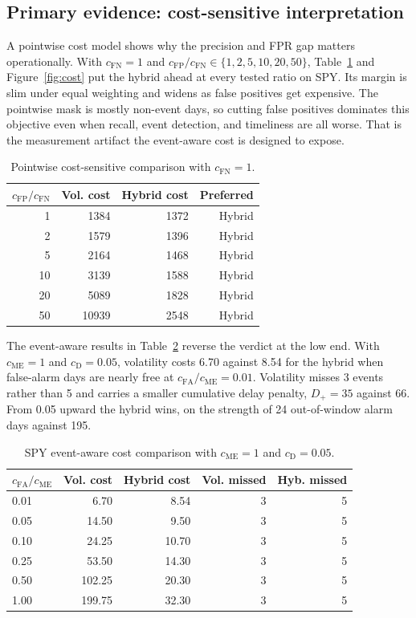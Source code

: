 \documentclass[pdflatex,sn-mathphys-num,iicol]{sn-jnl}
\begin{document}
\subsection{Primary evidence: cost-sensitive interpretation}
\label{sec:cost}
A pointwise cost model shows why the precision and FPR gap matters operationally. With $c_{\mathrm{FN}}=1$ and $c_{\mathrm{FP}}/c_{\mathrm{FN}}\in\{1,2,5,10,20,50\}$, Table~\ref{tab:cost} and Figure~\ref{fig:cost} put the hybrid ahead at every tested ratio on SPY. Its margin is slim under equal weighting and widens as false positives get expensive. The pointwise mask is mostly non-event days, so cutting false positives dominates this objective even when recall, event detection, and timeliness are all worse. That is the measurement artifact the event-aware cost is designed to expose.

\begin{table}[t]
\centering
\caption{Pointwise cost-sensitive comparison with $c_{\mathrm{FN}}=1$.}
\label{tab:cost}
\scriptsize
\begin{tabular}{rrrr}
\toprule
$c_{\mathrm{FP}}/c_{\mathrm{FN}}$ & Vol. cost & Hybrid cost & Preferred\\
\midrule
1 & 1384 & 1372 & Hybrid\\
2 & 1579 & 1396 & Hybrid\\
5 & 2164 & 1468 & Hybrid\\
10 & 3139 & 1588 & Hybrid\\
20 & 5089 & 1828 & Hybrid\\
50 & 10939 & 2548 & Hybrid\\
\bottomrule
\end{tabular}
\end{table}

The event-aware results in Table~\ref{tab:event_cost} reverse the verdict at the low end. With $c_{\mathrm{ME}}=1$ and $c_{\mathrm{D}}=0.05$, volatility costs 6.70 against 8.54 for the hybrid when false-alarm days are nearly free at $c_{\mathrm{FA}}/c_{\mathrm{ME}}=0.01$. Volatility misses 3 events rather than 5 and carries a smaller cumulative delay penalty, $D_+=35$ against 66. From 0.05 upward the hybrid wins, on the strength of 24 out-of-window alarm days against 195.

\begin{table}[t]
\centering
\caption{SPY event-aware cost comparison with $c_{\mathrm{ME}}=1$ and $c_{\mathrm{D}}=0.05$.}
\label{tab:event_cost}
\scriptsize
\begin{tabular}{lrrrr}
\toprule
$c_{\mathrm{FA}}/c_{\mathrm{ME}}$ & Vol. cost & Hybrid cost & Vol. missed & Hyb. missed\\
\midrule
0.01 & 6.70 & 8.54 & 3 & 5\\
0.05 & 14.50 & 9.50 & 3 & 5\\
0.10 & 24.25 & 10.70 & 3 & 5\\
0.25 & 53.50 & 14.30 & 3 & 5\\
0.50 & 102.25 & 20.30 & 3 & 5\\
1.00 & 199.75 & 32.30 & 3 & 5\\
\bottomrule
\end{tabular}
\end{table}
\end{document}
